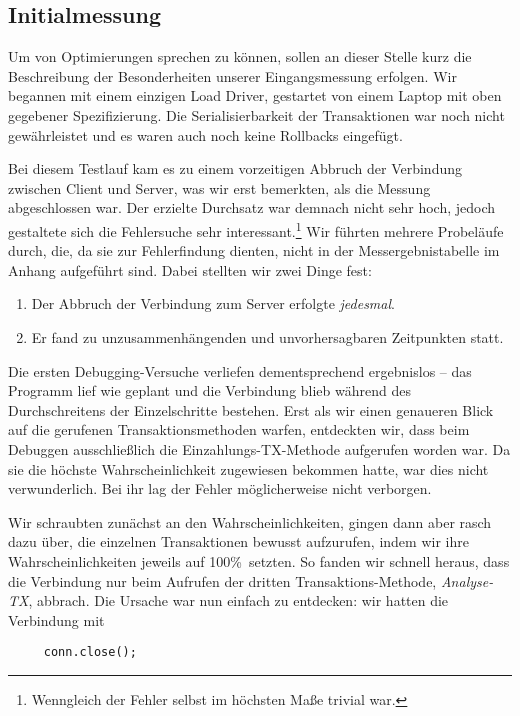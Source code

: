 \documentclass[a4paper, bibliography=totoc, 12pt]{scrartcl}
\begin{document}
	\subsection{Initialmessung}
	Um von Optimierungen sprechen zu können, sollen an dieser Stelle kurz die Beschreibung der Besonderheiten unserer Eingangsmessung erfolgen. Wir begannen mit einem einzigen Load Driver, gestartet von einem Laptop mit oben gegebener Spezifizierung. Die Serialisierbarkeit der Transaktionen war noch nicht gewährleistet und es waren auch noch keine Rollbacks eingefügt. 
	
	\noindent
	Bei diesem Testlauf kam es zu einem vorzeitigen Abbruch der Verbindung zwischen Client und Server, was wir erst bemerkten, als die Messung abgeschlossen war. Der erzielte Durchsatz war demnach nicht sehr hoch, jedoch gestaltete sich die Fehlersuche sehr interessant.\footnote{Wenngleich der Fehler selbst im höchsten Maße trivial war.} Wir führten mehrere Probeläufe durch, die, da sie zur Fehlerfindung dienten, nicht in der Messergebnistabelle im Anhang aufgeführt sind. Dabei stellten wir zwei Dinge fest:
\begin{enumerate}
\itemsep0pt
\item Der Abbruch der Verbindung zum Server erfolgte \emph{jedesmal}.
\item Er fand zu unzusammenhängenden und unvorhersagbaren Zeitpunkten statt.
\end{enumerate}	
	 Die ersten Debugging-Versuche verliefen dementsprechend ergebnislos -- das Programm lief wie geplant und die Verbindung blieb während des Durchschreitens der Einzelschritte bestehen. Erst als wir einen genaueren Blick auf die gerufenen Transaktionsmethoden warfen, entdeckten wir, dass beim Debuggen ausschließlich die Einzahlungs-TX-Methode aufgerufen worden war. Da sie die höchste Wahrscheinlichkeit zugewiesen bekommen hatte, war dies nicht verwunderlich. Bei ihr lag der Fehler möglicherweise nicht verborgen.
	 
	 Wir schraubten zunächst an den Wahrscheinlichkeiten, gingen dann aber rasch dazu über, die einzelnen Transaktionen bewusst aufzurufen, indem wir ihre Wahrscheinlichkeiten jeweils auf 100\%\ setzten. So fanden wir schnell heraus, dass die Verbindung nur beim Aufrufen der dritten Transaktions-Methode, \emph{Analyse-TX}, abbrach. Die Ursache war nun einfach zu entdecken: wir hatten die Verbindung mit 
	 \begin{lstlisting}
	 conn.close();
	 \end{lstlisting}
\end{document}
